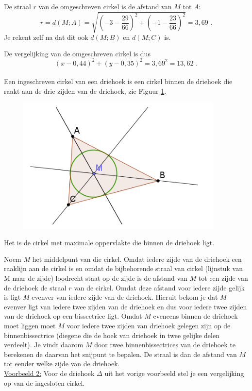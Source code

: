 De straal $r$ van de omgeschreven cirkel is de afstand van $M$ tot $A$:
\[
r=d(M;A)=\sqrt {\left(  -3-\frac {29}{66} \right)^2+\left( -1-\frac {23}{66} \right)^2}=3,69 \text { .}
\]
Je rekent zelf na dat dit ook $d(M;B)$ en $d(M;C)$ is.

De vergelijking van de omgeschreven cirkel is dus
\[
(x-0,44)^2+(y-0,35)^2=3,69^2=13,62 \text { .}
\]\\

Een ingeschreven cirkel van een driehoek is een cirkel binnen de driehoek die raakt aan de drie zijden van de driehoek, zie Figuur \ref{fig4.2.15_fig3}.
\begin{figure}[h]
\begin{center}
\includegraphics[height=5 cm]{4_opp_inhoud_an_meetk/inputs/AMTekst7Fig3}
\caption{}
\label{fig4.2.15_fig3}
\end{center}
\end{figure}
Het is de cirkel met maximale oppervlakte die binnen de driehoek ligt.

Noem $M$ het middelpunt van die cirkel.
Omdat iedere zijde van de driehoek een raaklijn aan de cirkel is en omdat de bijbehorende straal van cirkel (lijnstuk van M naar de zijde) loodrecht staat op de zijde is de afstand van $M$ tot een zijde van de driehoek de straal $r$ van de cirkel.
Omdat deze afstand voor iedere zijde gelijk is ligt $M$ evenver van iedere zijde van de driehoek.
Hieruit bekom je dat $M$ evenver ligt van iedere twee zijden van de driehoek en dus voor iedere twee zijden van de driehoek op een bissectrice ligt.
Omdat $M$ eveneens binnen de driehoek moet liggen moet $M$ voor iedere twee zijden van driehoek gelegen zijn op de binnenbissectrice (diegene die de hoek van driehoek in twee gelijke delen verdeelt).
Je vindt daarom $M$ door twee binnenbissectrices van de driehoek te berekenen de daarvan het snijpunt te bepalen.
De straal is dan de afstand van $M$ tot eender welke zijde van de driehoek.\\

\noindent \underline{Voorbeeld 2:} Voor de driehoek $\Delta$ uit het vorige voorbeeld stel je een vergelijking op van de ingesloten cirkel.

